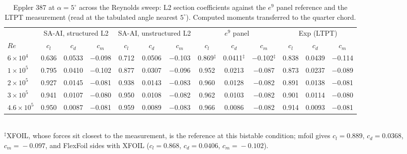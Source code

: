 \documentclass[10pt]{article}
\begin{document}
\begin{table}[H]
  \centering\footnotesize
  \setlength{\tabcolsep}{3.5pt}
  \caption{Eppler 387 at $\alpha\!=\!5^\circ$ across the Reynolds
  sweep: L2 section coefficients against the $e^9$ panel reference and
  the LTPT measurement (read at the tabulated angle nearest $5^\circ$).
  Computed moments transferred to the quarter chord.}
  \label{t:eppresweep}
  \begin{tabular}{l ccc ccc ccc ccc}
    \toprule
    & \multicolumn{3}{c}{SA-AI, structured L2} & \multicolumn{3}{c}{SA-AI, unstructured L2}
    & \multicolumn{3}{c}{$e^9$ panel} & \multicolumn{3}{c}{Exp (LTPT)}\\
    \cmidrule(lr){2-4}\cmidrule(lr){5-7}\cmidrule(lr){8-10}\cmidrule(lr){11-13}
    $Re$ & $c_l$ & $c_d$ & $c_m$ & $c_l$ & $c_d$ & $c_m$ & $c_l$ & $c_d$ & $c_m$ & $c_l$ & $c_d$ & $c_m$ \\
    \midrule
    $6\!\times\!10^4$   & 0.636 & 0.0533 & $-$0.098 & 0.712 & 0.0506 & $-$0.103 & 0.869$^\ddagger$ & 0.0411$^\ddagger$ & $-$0.102$^\ddagger$ & 0.838 & 0.0439 & $-$0.114 \\
    $1\!\times\!10^5$   & 0.795 & 0.0410 & $-$0.102 & 0.877 & 0.0307 & $-$0.096 & 0.952 & 0.0213 & $-$0.087 & 0.873 & 0.0237 & $-$0.089 \\
    $2\!\times\!10^5$   & 0.927 & 0.0145 & $-$0.081 & 0.938 & 0.0143 & $-$0.083 & 0.960 & 0.0128 & $-$0.082 & 0.891 & 0.0138 & $-$0.081 \\
    $3\!\times\!10^5$   & 0.941 & 0.0107 & $-$0.080 & 0.950 & 0.0108 & $-$0.082 & 0.962 & 0.0103 & $-$0.082 & 0.901 & 0.0114 & $-$0.080 \\
    $4.6\!\times\!10^5$ & 0.950 & 0.0087 & $-$0.081 & 0.959 & 0.0089 & $-$0.083 & 0.966 & 0.0086 & $-$0.082 & 0.914 & 0.0093 & $-$0.081 \\
    \bottomrule
  \end{tabular}
  \\[2pt]{\footnotesize $^\ddagger$XFOIL, whose forces sit closest to
  the measurement, is the reference at this bistable condition; mfoil
  gives $c_l\!=\!0.889$, $c_d\!=\!0.0368$, $c_m\!=\!-0.097$, and
  FlexFoil sides with XFOIL ($c_l\!=\!0.868$, $c_d\!=\!0.0406$,
  $c_m\!=\!-0.102$).}
\end{table}
\end{document}
